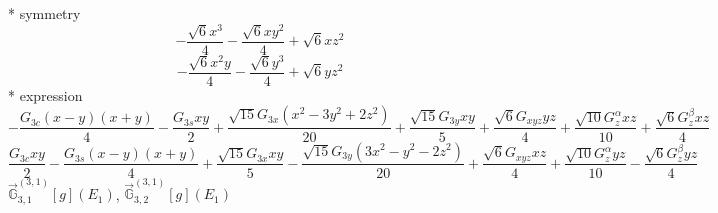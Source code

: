 \documentclass[fleqn,8pt]{jsarticle}
\begin{document}
\noindent\quad ** symmetry
\begin{dmath*}
- \frac{\sqrt{6} x^{3}}{4} - \frac{\sqrt{6} x y^{2}}{4} + \sqrt{6} x z^{2}
\end{dmath*}
\begin{dmath*}
- \frac{\sqrt{6} x^{2} y}{4} - \frac{\sqrt{6} y^{3}}{4} + \sqrt{6} y z^{2}
\end{dmath*}
\noindent\quad ** expression
\begin{dmath*}
- \frac{G_{3c} \left(x - y\right) \left(x + y\right)}{4} - \frac{G_{3s} x y}{2} + \frac{\sqrt{15} G_{3x} \left(x^{2} - 3 y^{2} + 2 z^{2}\right)}{20} + \frac{\sqrt{15} G_{3y} x y}{5} + \frac{\sqrt{6} G_{xyz} y z}{4} + \frac{\sqrt{10} G_{z}^{\alpha} x z}{10} + \frac{\sqrt{6} G_{z}^{\beta} x z}{4}
\end{dmath*}
\begin{dmath*}
\frac{G_{3c} x y}{2} - \frac{G_{3s} \left(x - y\right) \left(x + y\right)}{4} + \frac{\sqrt{15} G_{3x} x y}{5} - \frac{\sqrt{15} G_{3y} \left(3 x^{2} - y^{2} - 2 z^{2}\right)}{20} + \frac{\sqrt{6} G_{xyz} x z}{4} + \frac{\sqrt{10} G_{z}^{\alpha} y z}{10} - \frac{\sqrt{6} G_{z}^{\beta} y z}{4}
\end{dmath*}
\noindent\quad $\vec{\mathbb{G}}_{3,1}^{(3,1)}[g](E_{1})$, $\vec{\mathbb{G}}_{3,2}^{(3,1)}[g](E_{1})$
\end{document}
